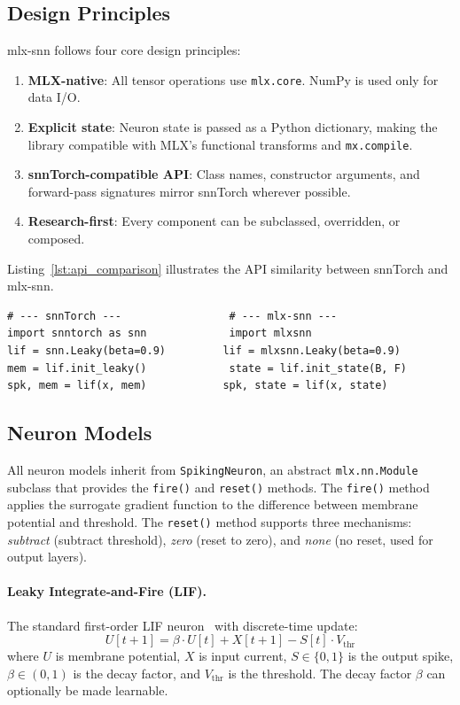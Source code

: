 \documentclass[11pt]{article}
\begin{document}
\subsection{Design Principles}

mlx-snn follows four core design principles:

\begin{enumerate}[nosep]
    \item \textbf{MLX-native}: All tensor operations use \texttt{mlx.core}. NumPy is used only for data I/O.
    \item \textbf{Explicit state}: Neuron state is passed as a Python dictionary, making the library compatible with MLX's functional transforms and \texttt{mx.compile}.
    \item \textbf{snnTorch-compatible API}: Class names, constructor arguments, and forward-pass signatures mirror snnTorch wherever possible.
    \item \textbf{Research-first}: Every component can be subclassed, overridden, or composed.
\end{enumerate}

\noindent Listing~\ref{lst:api_comparison} illustrates the API similarity between snnTorch and mlx-snn.

\begin{lstlisting}[caption={API comparison: snnTorch (left comments) vs.\ mlx-snn.}, label={lst:api_comparison}]
# --- snnTorch ---                 # --- mlx-snn ---
import snntorch as snn             import mlxsnn
lif = snn.Leaky(beta=0.9)         lif = mlxsnn.Leaky(beta=0.9)
mem = lif.init_leaky()             state = lif.init_state(B, F)
spk, mem = lif(x, mem)            spk, state = lif(x, state)
\end{lstlisting}

\subsection{Neuron Models}

All neuron models inherit from \texttt{SpikingNeuron}, an abstract \texttt{mlx.nn.Module} subclass that provides the \texttt{fire()} and \texttt{reset()} methods. The \texttt{fire()} method applies the surrogate gradient function to the difference between membrane potential and threshold. The \texttt{reset()} method supports three mechanisms: \textit{subtract} (subtract threshold), \textit{zero} (reset to zero), and \textit{none} (no reset, used for output layers).

\paragraph{Leaky Integrate-and-Fire (LIF).}
The standard first-order LIF neuron~\citep{gerstner2002spiking} with discrete-time update:
\begin{equation}
    U[t+1] = \beta \cdot U[t] + X[t+1] - S[t] \cdot V_{\text{thr}}
    \label{eq:lif}
\end{equation}
where $U$ is membrane potential, $X$ is input current, $S \in \{0,1\}$ is the output spike, $\beta \in (0,1)$ is the decay factor, and $V_{\text{thr}}$ is the threshold. The decay factor $\beta$ can optionally be made learnable.
\end{document}
